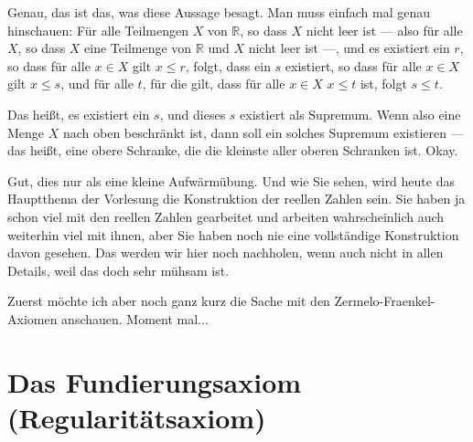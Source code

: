 \begin{spoken-clean}[00:01:43 - 00:03:45]
Genau, das ist das, was diese Aussage besagt. Man muss einfach mal genau hinschauen: Für alle Teilmengen $X$ von $\mathbb{R}$, so dass $X$ nicht leer ist --- also für alle $X$, so dass $X$ eine Teilmenge von $\mathbb{R}$ und $X$ nicht leer ist ---, und es existiert ein $r$, so dass für alle $x \in X$ gilt $x \le r$, folgt, dass ein $s$ existiert, so dass für alle $x \in X$ gilt $x \le s$, und für alle $t$, für die gilt, dass für alle $x \in X$ $x \le t$ ist, folgt $s \le t$.

Das heißt, es existiert ein $s$, und dieses $s$ existiert als Supremum. Wenn also eine Menge $X$ nach oben beschränkt ist, dann soll ein solches Supremum existieren --- das heißt, eine obere Schranke, die die kleinste aller oberen Schranken ist. Okay.

Gut, dies nur als eine kleine Aufwärmübung. Und wie Sie sehen, wird heute das Hauptthema der Vorlesung die Konstruktion der reellen Zahlen sein. Sie haben ja schon viel mit den reellen Zahlen gearbeitet und arbeiten wahrscheinlich auch weiterhin viel mit ihnen, aber Sie haben noch nie eine vollständige Konstruktion davon gesehen. Das werden wir hier noch nachholen, wenn auch nicht in allen Details, weil das doch sehr mühsam ist.

Zuerst möchte ich aber noch ganz kurz die Sache mit den Zermelo-Fraenkel-Axiomen anschauen. Moment mal...
\end{spoken-clean}

\section{Das Fundierungsaxiom (Regularitätsaxiom)}


